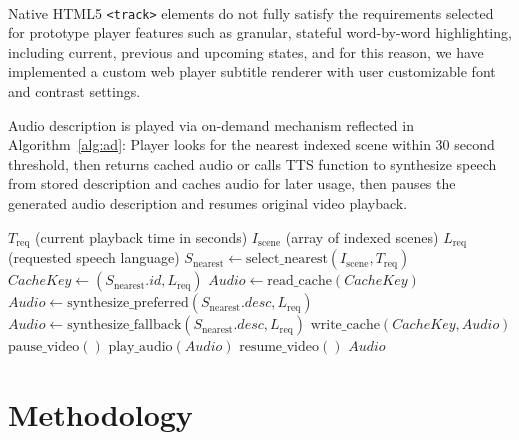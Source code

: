 ﻿﻿\documentclass[conference]{IEEEtran}
\begin{document}
Native HTML5 \texttt{<track>} elements do not fully satisfy the requirements selected for prototype player features such as granular, stateful word-by-word highlighting, including current, previous and upcoming states, and for this reason, we have implemented a custom web player subtitle renderer with user customizable font and contrast settings.

Audio description is played via on-demand mechanism reflected in Algorithm~\ref{alg:ad}: Player looks for the nearest indexed scene within 30 second threshold, then returns cached audio or calls TTS function to synthesize speech from stored description and caches audio for later usage, then pauses the generated audio description and resumes original video playback.

\begin{algorithm}[!t]
\caption{On-Demand Audio Description Resolution}
\label{alg:ad}
\begin{algorithmic}[1]
\Require $T_{\text{req}}$ (current playback time in seconds)
\Require $I_{\text{scene}}$ (array of indexed scenes)
\Require $L_{\text{req}}$ (requested speech language)
\State $S_{\text{nearest}} \gets \text{select\_nearest}(I_{\text{scene}}, T_{\text{req}})$
    \State \Return {}
\EndIf
\State $CacheKey \gets (S_{\text{nearest}}.id, L_{\text{req}})$
    \State $Audio \gets \text{read\_cache}(CacheKey)$
\Else
        \State $Audio \gets \text{synthesize\_preferred}(S_{\text{nearest}}.desc, L_{\text{req}})$
    \Else
        \State $Audio \gets \text{synthesize\_fallback}(S_{\text{nearest}}.desc, L_{\text{req}})$
    \EndIf
    \State $\text{write\_cache}(CacheKey, Audio)$
\EndIf
\State $\text{pause\_video}()$
\State $\text{play\_audio}(Audio)$
\State $\text{resume\_video}()$
\State \Return $Audio$
\end{algorithmic}
\end{algorithm}

\section{Methodology}
\end{document}
